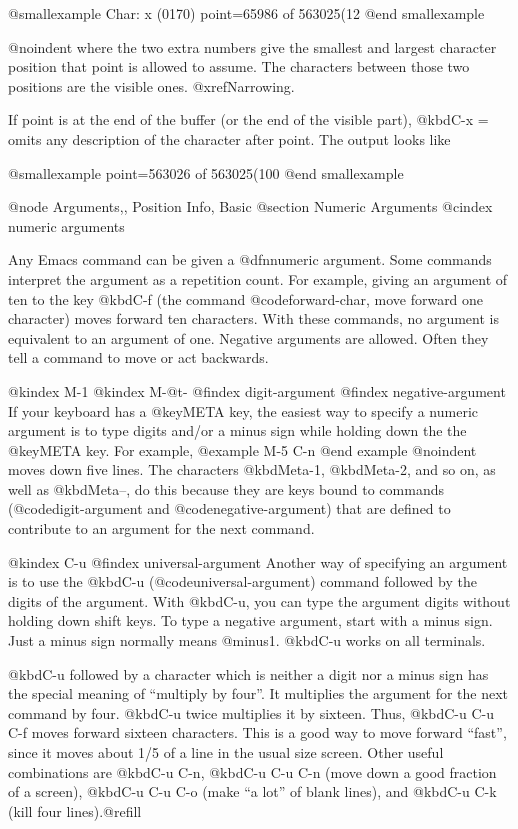 {{@smallexample
Char: x (0170)  point=65986 of 563025(12%
@end smallexample

@noindent
where the two extra numbers give the smallest and largest character position
that point is allowed to assume.  The characters between those two positions
are the visible ones.  @xref{Narrowing}.

  If point is at the end of the buffer (or the end of the visible part),
@kbd{C-x =} omits any description of the character after point.
The output looks like

@smallexample
point=563026 of 563025(100%
@end smallexample

@node Arguments,, Position Info, Basic
@section Numeric Arguments
@cindex numeric arguments

  Any Emacs command can be given a @dfn{numeric argument}.  Some commands
interpret the argument as a repetition count.  For example, giving an
argument of ten to the key @kbd{C-f} (the command @code{forward-char}, move
forward one character) moves forward ten characters.  With these commands,
no argument is equivalent to an argument of one.  Negative arguments are
allowed.  Often they tell a command to move or act backwards.

@kindex M-1
@kindex M-@t{-}
@findex digit-argument
@findex negative-argument
  If your keyboard has a @key{META} key, the easiest way to
specify a numeric argument is to type digits and/or a minus sign while
holding down the the @key{META} key.  For example,
@example
M-5 C-n
@end example
@noindent
moves down five lines.  The characters @kbd{Meta-1}, @kbd{Meta-2}, and
so on, as well as @kbd{Meta--}, do this because they are keys bound to
commands (@code{digit-argument} and @code{negative-argument}) that are
defined to contribute to an argument for the next command.

@kindex C-u
@findex universal-argument
  Another way of specifying an argument is to use the @kbd{C-u}
(@code{universal-argument}) command followed by the digits of the argument.
With @kbd{C-u}, you can type the argument digits without holding
down shift keys.  To type a negative argument, start with a minus sign.
Just a minus sign normally means @minus{}1.  @kbd{C-u} works on all terminals.

  @kbd{C-u} followed by a character which is neither a digit nor a minus
sign has the special meaning of ``multiply by four''.  It multiplies the
argument for the next command by four.  @kbd{C-u} twice multiplies it by
sixteen.  Thus, @kbd{C-u C-u C-f} moves forward sixteen characters.  This
is a good way to move forward ``fast'', since it moves about 1/5 of a line
in the usual size screen.  Other useful combinations are @kbd{C-u C-n},
@kbd{C-u C-u C-n} (move down a good fraction of a screen), @kbd{C-u C-u
C-o} (make ``a lot'' of blank lines), and @kbd{C-u C-k} (kill four
lines).@refill

}}
